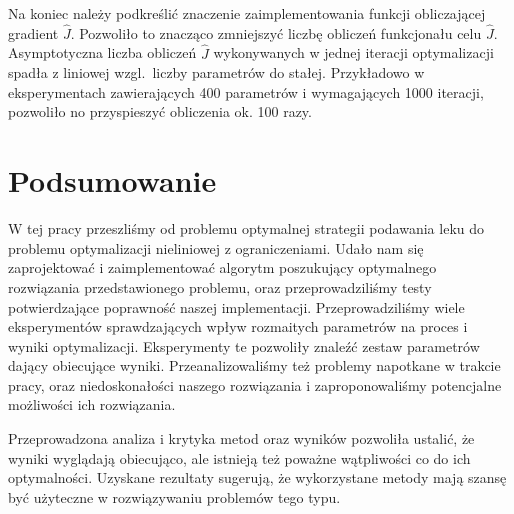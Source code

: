 \documentclass[licencjacka]{pracamgr}
\begin{document}
Na koniec należy podkreślić znaczenie zaimplementowania funkcji obliczającej gradient $\hat{J}$. Pozwoliło to znacząco zmniejszyć liczbę obliczeń funkcjonału celu $\hat{J}$. Asymptotyczna liczba obliczeń $\hat{J}$ wykonywanych w jednej iteracji optymalizacji spadła z liniowej wzgl.\ liczby parametrów do stałej. Przykładowo w eksperymentach zawierających 400 parametrów i wymagających 1000 iteracji, pozwoliło no przyspieszyć obliczenia ok. 100 razy.

\chapter{Podsumowanie}
W tej pracy przeszliśmy od problemu optymalnej strategii podawania leku do problemu optymalizacji nieliniowej z ograniczeniami. Udało nam się zaprojektować i zaimplementować algorytm poszukujący optymalnego rozwiązania przedstawionego problemu, oraz przeprowadziliśmy testy potwierdzające poprawność naszej implementacji. Przeprowadziliśmy wiele eksperymentów sprawdzających wpływ rozmaitych parametrów na proces i wyniki optymalizacji. Eksperymenty te pozwoliły znaleźć zestaw parametrów dający obiecujące wyniki. Przeanalizowaliśmy też problemy napotkane w trakcie pracy, oraz niedoskonałości naszego rozwiązania i zaproponowaliśmy potencjalne możliwości ich rozwiązania.

Przeprowadzona analiza i krytyka metod oraz wyników pozwoliła ustalić, że wyniki wyglądają obiecująco, ale istnieją też poważne wątpliwości co do ich optymalności. Uzyskane rezultaty sugerują, że wykorzystane metody mają szansę być użyteczne w rozwiązywaniu problemów tego typu.

\newpage{}
{}

\end{document}
